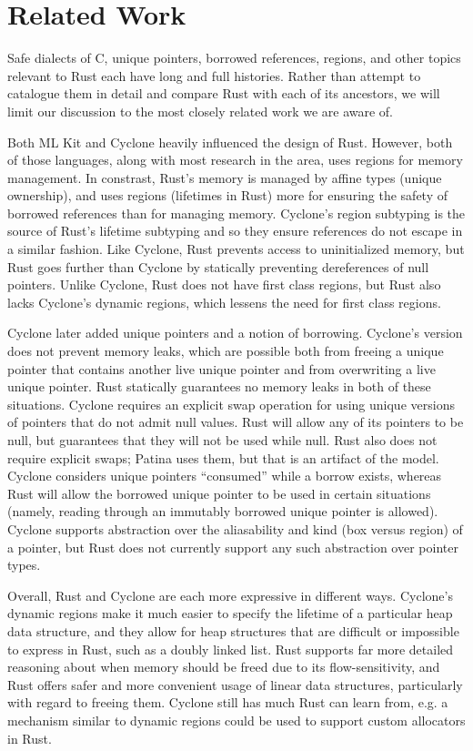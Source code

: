 \section*{Related Work}

Safe dialects of C, unique pointers, borrowed references, 
regions, and other topics relevant to Rust each have long
and full histories. Rather than attempt to catalogue them in detail
and compare Rust with each of its ancestors, we will limit our discussion
to the most closely related work we are aware of.

Both ML Kit \cite{mlkit-4.3.0, mlkitregions}
and Cyclone \cite{cycregions} heavily influenced the design of Rust.
However, both of those languages, along with most research in the area,
uses regions for memory management. In constrast, Rust's memory is managed
by affine types (unique ownership), and uses regions (lifetimes in Rust)
more for ensuring the safety of borrowed references than for managing memory.
Cyclone's region subtyping is the source of Rust's lifetime subtyping
and so they ensure references do not escape in a similar fashion.
Like Cyclone, Rust prevents access to uninitialized memory,
but Rust goes further than Cyclone by statically preventing dereferences of null pointers.
Unlike Cyclone, Rust does not have first class regions, but Rust also
lacks Cyclone's dynamic regions, which lessens the need for first class regions.

Cyclone later added unique pointers and a notion of borrowing. \cite{cycsafe, cycexperience}
Cyclone's version does not prevent memory leaks, which are possible both from
freeing a unique pointer that contains another live unique pointer and from
overwriting a live unique pointer. Rust statically guarantees no memory leaks in both
of these situations. Cyclone requires an explicit swap operation for using unique versions
of pointers that do not admit null values. Rust will allow any of its pointers to be null,
but guarantees that they will not be used while null. Rust also does not require explicit swaps;
Patina uses them, but that is an artifact of the model.
Cyclone considers unique pointers ``consumed'' while a borrow exists, 
whereas Rust will allow the borrowed unique pointer to be used in certain situations
(namely, reading through an immutably borrowed unique pointer is allowed).
Cyclone supports abstraction over the aliasability and kind (box versus region) of a pointer,
but Rust does not currently support any such abstraction over pointer types.

Overall, Rust and Cyclone are each more expressive in different ways.
Cyclone's dynamic regions make it much easier to specify the lifetime of
a particular heap data structure, and they allow for heap structures that
are difficult or impossible to express in Rust, such as a doubly linked list.
Rust supports far more detailed reasoning about when memory should be freed
due to its flow-sensitivity, and Rust offers safer and more convenient
usage of linear data structures, particularly with regard to freeing them.
Cyclone still has much Rust can learn from, e.g. a mechanism similar to
dynamic regions could be used to support custom allocators in Rust.

